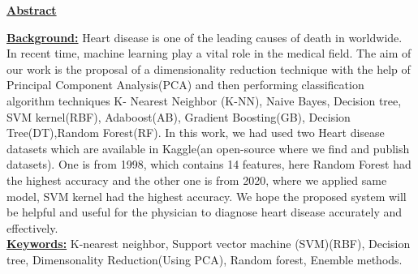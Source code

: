 \documentclass[11pt]{article}
\begin{document}
\tableofcontents
\thispagestyle{empty}
\clearpage
\setcounter{page}{1}
\begin{center}
\begin{Large}
\underline{\textbf{Abstract}}
\end{Large}
\end{center}
\underline{\textbf{Background:}} Heart disease is one of the leading causes of death in worldwide. In recent time, machine learning play a vital role in the medical field. The aim of our work is the proposal of a dimensionality reduction technique with the help of Principal Component Analysis(PCA) and then performing classification algorithm techniques K- Nearest Neighbor (K-NN), Naive Bayes, Decision tree, SVM kernel(RBF), Adaboost(AB), Gradient Boosting(GB), Decision Tree(DT),Random  Forest(RF). In this work, we had used two Heart disease datasets which are available in Kaggle(an open-source where we find and publish datasets). One is from 1998, which contains 14 features, here Random Forest had the highest accuracy and the other one is from 2020, where we applied same model, SVM kernel had the highest accuracy. We hope the proposed system will be helpful and useful for the physician to diagnose heart disease accurately and effectively.\\
\underline{\textbf{Keywords:}}  K-nearest neighbor, Support vector machine (SVM)(RBF), Decision tree, Dimensonality Reduction(Using PCA), Random forest, Enemble methods.\\
\end{document}
